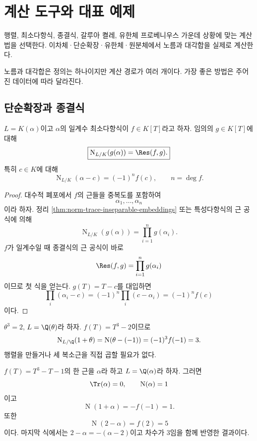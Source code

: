 \clearpage
\section{계산 도구와 대표 예제}
\label{sec:norm-trace-explicit-computations}

\begin{learninggoal}
행렬, 최소다항식, 종결식, 갈루아 켤레, 유한체 프로베니우스 가운데 상황에 맞는 계산법을 선택한다. 이차체·단순확장·유한체·원분체에서 노름과 대각합을 실제로 계산한다.
\end{learninggoal}

노름과 대각합은 정의는 하나이지만 계산 경로가 여러 개이다. 가장 좋은 방법은 주어진 데이터에 따라 달라진다.

\subsection{단순확장과 종결식}

\begin{theorem}
\label{thm:norm-resultant}
$L=K(\alpha)$이고 $\alpha$의 일계수 최소다항식이 $f\in K[T]$라고 하자. 임의의 $g\in K[T]$에 대해
\[
  \boxed{
  \operatorname N_{L/K}(g(\alpha))
  =\Res(f,g).}
\]
특히 $c\in K$에 대해
\[
  \boxed{
  \operatorname N_{L/K}(\alpha-c)
  =(-1)^n f(c),
  \qquad n=\deg f.}
\]
\end{theorem}

\begin{proof}
대수적 폐포에서 $f$의 근들을 중복도를 포함하여
\[
  \alpha_1,\dots,\alpha_n
\]
이라 하자. 정리 \ref{thm:norm-trace-inseparable-embeddings} 또는 특성다항식의 근 공식에 의해
\[
  \operatorname N_{L/K}(g(\alpha))
  =\prod_{i=1}^n g(\alpha_i).
\]
$f$가 일계수일 때 종결식의 근 공식이 바로
\[
  \Res(f,g)=\prod_{i=1}^n g(\alpha_i)
\]
이므로 첫 식을 얻는다. $g(T)=T-c$를 대입하면
\[
  \prod_i(\alpha_i-c)
  =(-1)^n\prod_i(c-\alpha_i)
  =(-1)^n f(c)
\]
이다.
\end{proof}

\begin{example}
$\theta^3=2$, $L=\Q(\theta)$라 하자. $f(T)=T^3-2$이므로
\[
  \operatorname N_{L/\Q}(1+\theta)
  =\operatorname N(\theta-(-1))
  =(-1)^3f(-1)=3.
\]
행렬을 만들거나 세 복소근을 직접 곱할 필요가 없다.
\end{example}

\begin{example}
$f(T)=T^3-T-1$의 한 근을 $\alpha$라 하고 $L=\Q(\alpha)$라 하자. 그러면
\[
  \Tr(\alpha)=0,
  \qquad
  \operatorname N(\alpha)=1
\]
이고
\[
  \operatorname N(1+\alpha)
  =-f(-1)=1.
\]
또한
\[
  \operatorname N(2-\alpha)=f(2)=5
\]
이다. 마지막 식에서는 $2-\alpha=-(\alpha-2)$이고 차수가 $3$임을 함께 반영한 결과이다.
\end{example}

